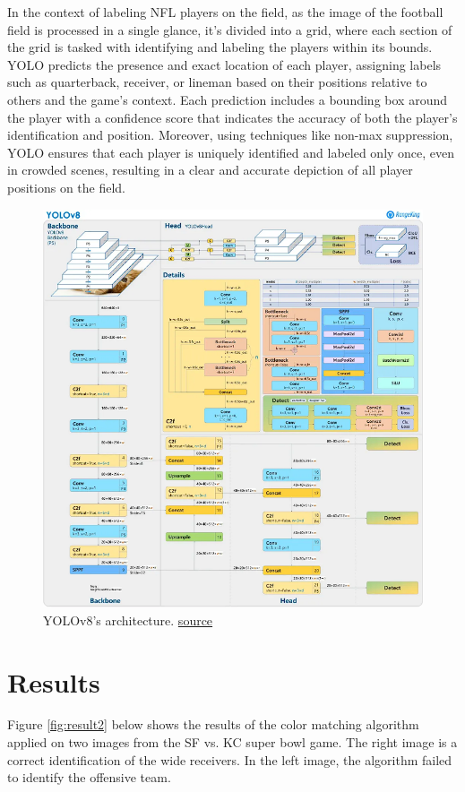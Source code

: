 In the context of labeling NFL players on the field, as the image of the football field is processed in a single glance, it's divided into a grid, where each section of the grid is tasked with identifying and labeling the players within its bounds. YOLO predicts the presence and exact location of each player, assigning labels such as quarterback, receiver, or lineman based on their positions relative to others and the game's context. Each prediction includes a bounding box around the player with a confidence score that indicates the accuracy of both the player's identification and position. Moreover, using techniques like non-max suppression, YOLO ensures that each player is uniquely identified and labeled only once, even in crowded scenes, resulting in a clear and accurate depiction of all player positions on the field. 
\begin{figure}[t]
    \centering
    \includegraphics[width=0.8\linewidth]{architecture.png}
    \caption{YOLOv8's architecture. \href{https://blog.roboflow.com/whats-new-in-yolov8/}{source}}
    \label{fig:architecture}
\end{figure}

\section{Results}

Figure \ref{fig:result2} below shows the results of the color matching algorithm applied on two images from the SF vs. KC super bowl game. The right image is a correct identification of the wide receivers. In the left image, the algorithm failed to identify the offensive team.

